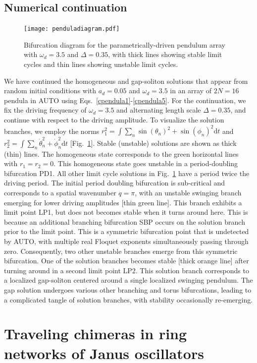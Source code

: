 \documentclass[aps,pre,amsmath,amssymb,floatfix,onecolumn,notitlepage,10pt]{revtex4-1}
\begin{document}
\subsection{Numerical continuation}
\begin{figure}[htb]
\texttt{[image: penduladiagram.pdf]}
\caption{Bifurcation diagram for the parametrically-driven pendulum array with $\omega_d=3.5$ and $\Delta=0.35$, with thick lines showing stable limit cycles and thin lines showing unstable limit cycles. \label{fig2}}
\end{figure}
We have continued the homogeneous and gap-soliton solutions that appear from random initial conditions with $a_d=0.05$ and $\omega_d=3.5$ in an array of $2N=16$ pendula in AUTO using Eqs.~\eqref{cpendula1}-\eqref{cpendula5}. For the continuation, we fix the driving frequency of $\omega_d=3.5$ and alternating length scale $\Delta=0.35$, and continue with respect to the driving amplitude. To visualize the solution branches, we employ the norms $r_1^2=\int\sum_n\sin(\theta_n)^2+\sin(\phi_n)^2 {\mathrm d}t$ and $r_2^2=\int\sum_n\dot{\theta}_n^2+\dot{\phi}_n^2 {\mathrm d}t$ [Fig.~\ref{fig2}]. Stable (unstable) solutions are shown as thick (thin) lines. The homogeneous state corresponds to the green horizontal lines with $r_1=r_2=0$. This homogeneous state goes unstable in a period-doubling bifurcation PD1. All other limit cycle solutions in Fig.~\ref{fig2} have a period twice the driving period. The initial period doubling bifurcation is sub-critical and corresponds to a spatial wavenumber $q=\pi$, with an unstable swinging branch emerging for lower driving amplitudes [thin green line]. This branch exhibits a limit point LP1, but does not becomes stable when it turns around here. This is because an additional branching bifurcation SBP occurs on the solution branch prior to the limit point. This is a symmetric bifurcation point that is undetected by AUTO, with multiple real Floquet exponents simultaneously passing through zero. Consequently, two other unstable branches emerge from this symmetric bifurcation. One of the solution branches becomes stable [thick orange line] after turning around in a second limit point LP2. This solution branch corresponds to a localized gap-soliton centered around a single localized swinging pendulum. The gap solution undergoes various other branching and torus bifurcations, leading to a complicated tangle of solution branches, with stability occasionally re-emerging.

\section{Traveling chimeras in ring networks of Janus oscillators}
\end{document}

